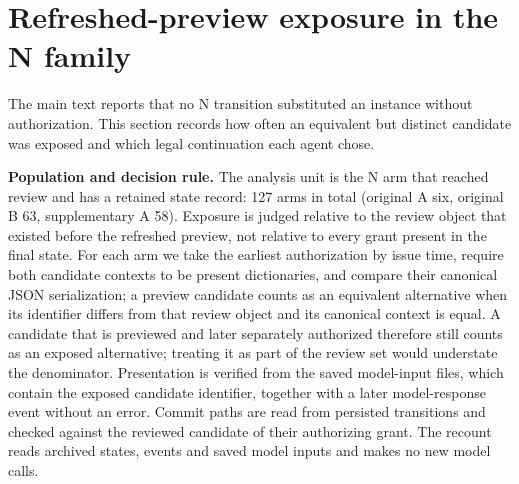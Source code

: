 \documentclass[10pt,a4paper]{article}
\begin{document}
\section{Refreshed-preview exposure in the N family}
The main text reports that no N transition substituted an instance without authorization. This section records how often an equivalent but distinct candidate was exposed and which legal continuation each agent chose.

\textbf{Population and decision rule.} The analysis unit is the N arm that reached review and has a retained state record: 127 arms in total (original A six, original B 63, supplementary A 58). Exposure is judged relative to the review object that existed before the refreshed preview, not relative to every grant present in the final state. For each arm we take the earliest authorization by issue time, require both candidate contexts to be present dictionaries, and compare their canonical JSON serialization; a preview candidate counts as an equivalent alternative when its identifier differs from that review object and its canonical context is equal. A candidate that is previewed and later separately authorized therefore still counts as an exposed alternative; treating it as part of the review set would understate the denominator. Presentation is verified from the saved model-input files, which contain the exposed candidate identifier, together with a later model-response event without an error. Commit paths are read from persisted transitions and checked against the reviewed candidate of their authorizing grant. The recount reads archived states, events and saved model inputs and makes no new model calls.
\end{document}
